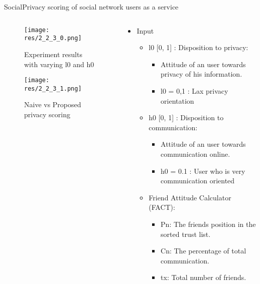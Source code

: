 \begin{frame}{Social}{Privacy scoring of social network users as a service \cite{vidyalakshmi_privacy_2015}}

	\begin{columns}
		\begin{column}{0.39\textwidth}
			\begin{center}
			
				\begin{figure}
					\texttt{[image: res/2\_2\_3\_0.png]}
					\caption{\label{fig:2_2_3_0}\tiny{Experiment results with varying l0 and h0}}
					
					\texttt{[image: res/2\_2\_3\_1.png]}
					\caption{\label{fig:2_2_3_1} \tiny{Naive vs Proposed privacy scoring}}
				\end{figure}
				
			\end{center}
		\end{column}
		
		\begin{column}{0.61\textwidth}
		
			\begin{itemize}

				\item Input
					\begin{itemize}
					
						\item l0 [0, 1] : Disposition to privacy:
							\begin{itemize}
								\item Attitude of an user towards privacy of his information.
								\item l0 = 0,1 :  Lax privacy orientation 
							\end{itemize}
							
						\item h0 [0, 1] : Disposition to communication:
							\begin{itemize}
								\item Attitude of an user towards communication online.
								\item h0 = 0.1 :  User who is very communication oriented
							\end{itemize}
						
						\item Friend Attitude Calculator (FACT):
							\begin{itemize}
								\item Pn: The friends position in the sorted trust list.
								\item Cn: The percentage of total communication.
								\item tx: Total number of friends.
							

\end{itemize}
\end{itemize}
\end{itemize}
\end{column}
\end{columns}
\end{frame}
